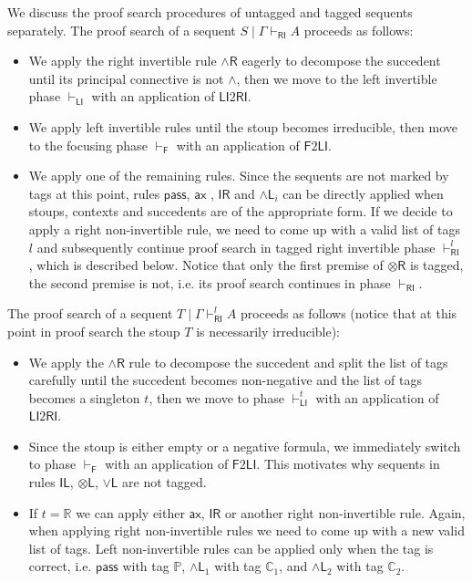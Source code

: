\documentclass[submission,copyright,creativecommons]{eptcs}
\theoremstyle{definition}
\newcommand{\tl}{\otimes \mathsf{L}}
\newcommand{\tr}{\otimes \mathsf{R}}
\newcommand{\pass}{\mathsf{pass}}
\newcommand{\unitl}{\mathsf{IL}}
\newcommand{\unitr}{\mathsf{IR}}
\newcommand{\andlone}{\land \mathsf{L}_{1}}
\newcommand{\andltwo}{\land \mathsf{L}_{2}}
\newcommand{\andli}{\land \mathsf{L}_{i}}
\newcommand{\andr}{\land \mathsf{R}}
\newcommand{\orl}{\lor \mathsf{L}}
\newcommand{\ax}{\mathsf{ax}}
\newcommand{\RI}{\mathsf{RI}}
\newcommand{\LI}{\mathsf{LI}}
\newcommand{\F}{\mathsf{F}}
\newcommand{\tP}{\mathbb{P}}
\newcommand{\tCone}{\mathbb{C}_1}
\newcommand{\tCtwo}{\mathbb{C}_2}
\newcommand{\tE}{\mathbb{R}}
\begin{document}
We discuss the proof search procedures of untagged and tagged sequents separately.
The proof search of a sequent $S \mid \Gamma \vdash_\RI A$ proceeds as follows:
\begin{itemize}
  \item[($\vdash_{\RI}$)] We apply the right invertible rule $\andr$ eagerly to decompose the succedent until its principal connective is not $\land$, then we move to the left invertible phase $\vdash_\LI$ with an application of $\LI 2 \RI$.
  \item[($\vdash_{\LI}$)] We apply left invertible rules until the stoup becomes irreducible, then move to the focusing phase $\vdash_\F$ with an application of $\F 2 \LI$.
  \item[($\vdash_{\F}$)] We apply one of the remaining rules. Since the sequents are not marked by tags at this point, rules $\pass$, $\ax$ , $\unitr$ and $\andli$ can be directly applied when stoups, contexts and succedents are of the appropriate form.
  If we decide to apply a right non-invertible rule, we need to come up with a valid list of tags $l$ and subsequently continue proof search in tagged right invertible phase $\vdash^{l}_{\RI}$, which is described below. Notice that only the first premise of $\tr$ is tagged, the second premise is not, i.e. its proof search continues in phase $\vdash_{\RI}$.
\end{itemize}
The proof search of a sequent $T \mid \Gamma \vdash^{l}_\RI A$ proceeds as follows (notice that at this point in proof search the stoup $T$ is necessarily irreducible):
\begin{itemize}
  \item[($\vdash^{l}_{\RI}$)] We apply the $\andr$ rule to decompose the succedent and split the list of tags carefully until the succedent becomes non-negative and the list of tags becomes a singleton $t$, then we move to phase $\vdash_\LI^t$ with an application of $\LI2 \RI$.
  \item[($\vdash^{t}_{\LI}$)] Since the stoup is either empty or a negative formula, we immediately switch to phase $\vdash_\F$ with an application of $\F 2 \LI$. This motivates why sequents in rules $\unitl$, $\tl$, $\orl$ are not tagged.
  \item[($\vdash^{t}_{\F}$)] If $t = \tE$ we can apply either $\ax$, $\unitr$ or another right non-invertible rule. Again, when applying right non-invertible rules we need to come up with a new valid list of tags.
  Left non-invertible rules can be applied only when the tag is correct, i.e. $\pass$ with tag $\tP$, $\andlone$ with tag $\tCone$, and $\andltwo$ with tag $\tCtwo$.
\end{itemize}
\end{document}
